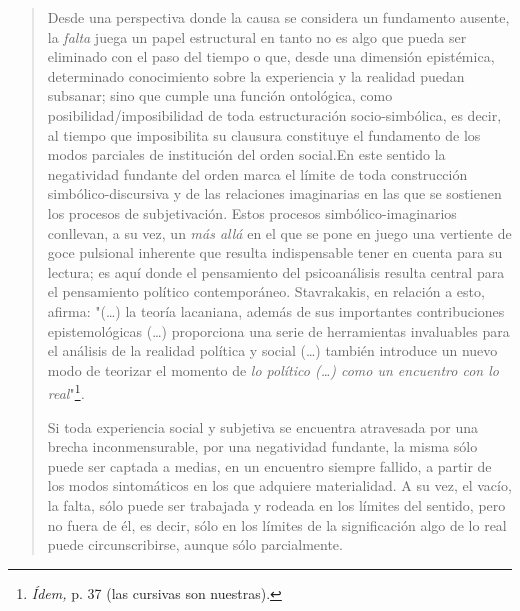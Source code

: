 \documentclass{book}
\begin{document}
\begin{quote}
Desde una perspectiva donde la causa se considera un fundamento ausente,
la \emph{falta} juega un papel estructural en tanto no es algo que pueda
ser eliminado con el paso del tiempo o que, desde una dimensión
epistémica, determinado conocimiento sobre la experiencia y la realidad
puedan subsanar; sino que cumple una función ontológica, como
posibilidad/imposibilidad de toda estructuración socio-simbólica, es
decir, al tiempo que imposibilita su clausura constituye el fundamento
de los modos parciales de institución del orden social.En este sentido
la negatividad fundante del orden marca el límite de toda construcción
simbólico-discursiva y de las relaciones imaginarias en las que se
sostienen los procesos de subjetivación. Estos procesos
simbólico-imaginarios conllevan, a su vez, un \emph{más allá} en el que
se pone en juego una vertiente de goce pulsional inherente que resulta
indispensable tener en cuenta para su lectura; es aquí donde el
pensamiento del psicoanálisis resulta central para el pensamiento
político contemporáneo. Stavrakakis, en relación a esto, afirma:
"(\dots) la teoría lacaniana, además de sus importantes
contribuciones epistemológicas (\dots) proporciona una serie de
herramientas invaluables para el análisis de la realidad política y
social (\dots) también introduce un nuevo modo de teorizar el
momento de \emph{lo político (\dots) como un encuentro con lo
real}"\footnote{\emph{Ídem,} p. 37 (las cursivas son nuestras).}\emph{.}

Si toda experiencia social y subjetiva se encuentra atravesada por una
brecha inconmensurable, por una negatividad fundante, la misma sólo
puede ser captada a medias, en un encuentro siempre fallido, a partir de
los modos sintomáticos en los que adquiere materialidad. A su vez, el
vacío, la falta, sólo puede ser trabajada y rodeada en los límites del
sentido, pero no fuera de él, es decir, sólo en los límites de la
significación algo de lo real puede circunscribirse, aunque sólo
parcialmente.


\end{quote}
\end{document}
